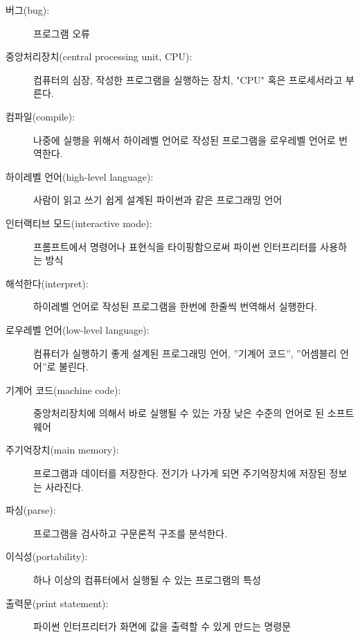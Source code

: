 \begin{description}

\item[버그(bug):]  프로그램 오류

\item[중앙처리장치(central processing unit, CPU):] 컴퓨터의 심장, 작성한 프로그램을 실행하는 장치, "CPU" 혹은 프로세서라고 부른다.

\item[컴파일(compile):]  나중에 실행을 위해서 하이레벨 언어로 작성된 프로그램을 로우레벨 언어로 번역한다.

\item[하이레벨 언어(high-level language):]  사람이 읽고 쓰기 쉽게 설계된 파이썬과 같은 프로그래밍 언어

\item[인터랙티브 모드(interactive mode):] 프롬프트에서 명령어나 표현식을 타이핑함으로써 파이썬 인터프리터를 사용하는 방식

\item[해석한다(interpret):] 하이레벨 언어로 작성된 프로그램을 한번에 한줄씩 번역해서 실행한다.

\item[로우레벨 언어(low-level language):] 컴퓨터가 실행하기 좋게 설계된 프로그래밍 언어, ''기계어 코드'', ''어셈블리 언어''로 불린다.

\item[기계어 코드(machine code):] 중앙처리장치에 의해서 바로 실행될 수 있는 가장 낮은 수준의 언어로 된 소프트웨어

\item[주기억장치(main memory):] 프로그램과 데이터를 저장한다. 전기가 나가게 되면 주기억장치에 저장된 정보는 사라진다.

\item[파싱(parse):]  프로그램을 검사하고 구문론적 구조를 분석한다.

\item[이식성(portability):] 하나 이상의 컴퓨터에서 실행될 수 있는 프로그램의 특성

\item[출력문(print statement):] 파이썬 인터프리터가 화면에 값을 출력할 수 있게 만드는 명령문



\end{description}
